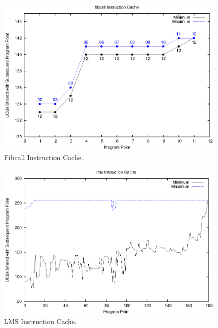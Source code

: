 \begin{figure}[h!]
\begin{center}
\includegraphics[width=\linewidth]{eps/fibcall-icache.eps}
\caption{Fibcall Instruction Cache.}
\label{fig:fibcall_instruction_cache}
\end{center}
\end{figure}
%
\begin{figure}[h!]
\vspace{-20pt}
\begin{center}
\includegraphics[width=\linewidth]{eps/lms-icache.eps}
\caption{LMS Instruction Cache.}
\label{fig:lms_instruction_cache}
\end{center}
\vspace{-10pt}
\end{figure}
%
\vspace{-20pt}
